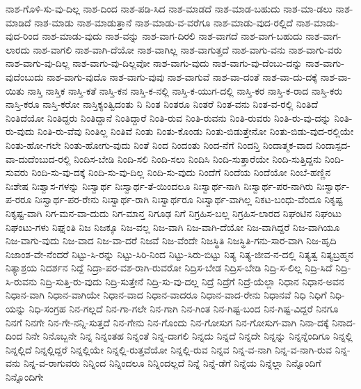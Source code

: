 {ನಾಶ-ಗೊಳಿ-ಸು-ವು-ದಿಲ್ಲ
ನಾಶ-ದಿಂದ
ನಾಶ-ಪಡಿ-ಸಿದ
ನಾಶ-ಮಾಡದೆ
ನಾಶ-ಮಾಡ-ಬಹುದು
ನಾಶ-ಮಾ-ಡಲು
ನಾಶ-ಮಾಡಿದೆ
ನಾಶ-ಮಾಡು
ನಾಶ-ಮಾಡುತ್ತಾನೆ
ನಾಶ-ಮಾಡು-ವ-ವರೆಗೂ
ನಾಶ-ಮಾಡು-ವುದ-ರಲ್ಲಿದೆ
ನಾಶ-ಮಾಡು-ವುದ-ರಿಂದ
ನಾಶ-ಮಾಡು-ವುದು
ನಾಶ-ವನ್ನು
ನಾಶ-ವಾಗ-ದಿರಲಿ
ನಾಶ-ವಾಗದೆ
ನಾಶ-ವಾಗ-ಬಹುದು
ನಾಶ-ವಾಗ-ಲಾರದು
ನಾಶ-ವಾಗಲಿ
ನಾಶ-ವಾಗಿ-ದೆಯೋ
ನಾಶ-ವಾಗಿಲ್ಲ
ನಾಶ-ವಾಗುತ್ತದೆ
ನಾಶ-ವಾಗು-ವನು
ನಾಶ-ವಾಗು-ವರು
ನಾಶ-ವಾಗು-ವು-ದಿಲ್ಲ
ನಾಶ-ವಾಗು-ವು-ದಿಲ್ಲವೋ
ನಾಶ-ವಾಗು-ವುದು
ನಾಶ-ವಾಗು-ವು-ದೆಂಬು-ದನ್ನು
ನಾಶ-ವಾಗು-ವುದೆಂಬುದು
ನಾಶ-ವಾಗು-ವುದೊ
ನಾಶ-ವಾಗು-ವುವು
ನಾಶ-ವಾಗುವೆ
ನಾಶ-ವಾ-ದಂತೆ
ನಾಶ-ವಾ-ದು-ದಕ್ಕೆ
ನಾಶ-ವಾ-ಯಿತು
ನಾಸ್ತಿ
ನಾಸ್ತಿಕ
ನಾಸ್ತಿ-ಕತೆ
ನಾಸ್ತಿ-ಕನ
ನಾಸ್ತಿ-ಕ-ನಲ್ಲಿ
ನಾಸ್ತಿ-ಕ-ಯುಗ-ದಲ್ಲಿ
ನಾಸ್ತಿ-ಕರ
ನಾಸ್ತಿ-ಕ-ರಾದ
ನಾಸ್ತಿ-ಕರು
ನಾಸ್ತಿ-ಕರೂ
ನಾಸ್ತಿ-ಕರೋ
ನಾಸ್ತಿಕ್ಯಂತ್ವಿದಂತು
ನಿ
ನಿಂತ
ನಿಂತರೂ
ನಿಂತರೆ
ನಿಂತ-ವನು
ನಿಂತ-ವ-ರಲ್ಲಿ
ನಿಂತಿದೆ
ನಿಂತಿದೆಯೋ
ನಿಂತಿದ್ದರು
ನಿಂತಿದ್ದಾನೆ
ನಿಂತಿದ್ದಾರೆ
ನಿಂತಿ-ರುವ
ನಿಂತಿ-ರುವನು
ನಿಂತಿ-ರುವರು
ನಿಂತಿ-ರು-ವು-ದನ್ನು
ನಿಂತಿ-ರು-ವುದು
ನಿಂತಿ-ರು-ವೆವು
ನಿಂತಿಲ್ಲ
ನಿಂತಿವೆ
ನಿಂತು
ನಿಂತು-ಕೊಂಡು
ನಿಂತು-ಬಿಡುತ್ತೇನೋ
ನಿಂತು-ಬಿಡು-ವುದ-ರಲ್ಲಿಯೇ
ನಿಂತು-ಹೋ-ಗಲೇ
ನಿಂತು-ಹೋಗು-ವುದು
ನಿಂತೆ
ನಿಂದ
ನಿಂದಂತು
ನಿಂದ-ನೆಗೆ
ನಿಂದನ್ತಿ
ನಿಂದಾತ್ಮಕ-ವಾದ
ನಿಂದಾಸ್ಪದ-ವಾ-ದುದೆಂಬುದ-ರಲ್ಲಿ
ನಿಂದಿಸ-ಬೇಡಿ
ನಿಂದಿ-ಸಲಿ
ನಿಂದಿ-ಸಲು
ನಿಂದಿಸಿ
ನಿಂದಿ-ಸುತ್ತಾರೆಯೇ
ನಿಂದಿ-ಸುತ್ತಿದ್ದನು
ನಿಂದಿ-ಸುವರು
ನಿಂದಿ-ಸು-ವು-ದಕ್ಕೆ
ನಿಂದಿ-ಸು-ವು-ದಿಲ್ಲ
ನಿಂದಿ-ಸು-ವುದು
ನಿಂದೆಗೆ
ನಿಂದೆಯ
ನಿಂದೆಯೋ
ನಿಂಬೆ-ಹಣ್ಣಿನ
ನಿಃಶೇಷ
ನಿಃಶ್ವಾಸ-ಗಳನ್ನು
ನಿಃಸ್ವಾರ್ಥ
ನಿಃಸ್ವಾರ್ಥ-ತೆ-ಯಿಂದಲೂ
ನಿಃಸ್ವಾರ್ಥ-ನಾಗಿ
ನಿಃಸ್ವಾರ್ಥ-ಪರ-ನಾಗಿರು
ನಿಃಸ್ವಾರ್ಥ-ಪ-ರರೂ
ನಿಃಸ್ವಾರ್ಥ-ಪರ-ರೇನು
ನಿಃಸ್ವಾರ್ಥ-ರಾಗಿ
ನಿಃಸ್ವಾರ್ಥರೂ
ನಿಃಸ್ವಾರ್ಥ-ವಾಗಿಲ್ಲ
ನಿಕಟ-ಬಂಧು-ವೆಂದೂ
ನಿಕೃಷ್ಟ
ನಿಕೃಷ್ಟ-ವಾಗಿ
ನಿಗ-ಮನ-ವಾ-ದುದು
ನಿಗ-ಮಾನ್ತ
ನಿಗೂಢ
ನಿಗೆ
ನಿಗ್ರಹಿಸ-ಬಲ್ಲ
ನಿಗ್ರಹಿಸ-ಲಾರದ
ನಿಘಂಟಿನ
ನಿಘಂಟು
ನಿಘಂಟು-ಗಳು
ನಿಘ್ನಂತಿ
ನಿಜ
ನಿಜಕ್ಕೂ
ನಿಜ-ವಲ್ಲ
ನಿಜ-ವಾಗಿ
ನಿಜ-ವಾಗಿ-ದೆಯೋ
ನಿಜ-ವಾಗಿದ್ದರೆ
ನಿಜ-ವಾಗಿಯೂ
ನಿಜ-ವಾಗು-ವುದು
ನಿಜ-ವಾದ
ನಿಜ-ವಾ-ದರೆ
ನಿಜವೆ
ನಿಜ-ವೆಂದೇ
ನಿಜಸ್ಥಿತಿ
ನಿಜಸ್ಥಿತಿ-ಗನು-ಸಾರ-ವಾಗಿ
ನಿಜ-ಹೃದಿ
ನಿಜಾಂಶ-ವೇ-ನೆಂದರೆ
ನಿಟ್ಟು-ಸಿ-ರನ್ನು
ನಿಟ್ಟು-ಸಿರಿ-ನಿಂದ
ನಿಟ್ಟು-ಸಿರು-ಬಿಟ್ಟು
ನಿತ್ಯ
ನಿತ್ಯ-ಜೀವ-ನ-ದಲ್ಲಿ
ನಿತ್ಯತ್ವ
ನಿತ್ಯಬ್ರಹ್ಮನ
ನಿತ್ಯಾಶ್ರಯ
ನಿದರ್ಶನ
ನಿದ್ದೆ
ನಿದ್ರಾ-ಪರ-ವಶ-ರಾಗಿ-ರುವರೋ
ನಿದ್ರಿಸ-ಬೇಡ
ನಿದ್ರಿಸ-ಬೇಡಿ
ನಿದ್ರಿ-ಸ-ಲಿಲ್ಲ
ನಿದ್ರಿ-ಸಿದೆ
ನಿದ್ರಿ-ಸಿ-ರುವನು
ನಿದ್ರಿ-ಸುತ್ತಿ-ರು-ವುದು
ನಿದ್ರಿ-ಸುತ್ತೇನೆ
ನಿದ್ರಿ-ಸು-ವು-ದಲ್ಲ
ನಿದ್ರೆ
ನಿದ್ರೆಗೆ
ನಿದ್ರೆ-ಯೆಲ್ಲಾ
ನಿಧಾನ
ನಿಧಾನ-ಅವನ
ನಿಧಾನ-ವಾಗಿ
ನಿಧಾನ-ವಾಗಿಯೇ
ನಿಧಾನ-ವಾದ
ನಿಧಾನ-ವಾದರೂ
ನಿಧಾನ-ವಾದ-ರೇನು
ನಿಧಾನವೆ
ನಿಧಿ
ನಿಧಿಗೆ
ನಿಧಿ-ಯನ್ನು
ನಿಧಿ-ಸಂಗ್ರಹ
ನಿನ-ಗಲ್ಲದೆ
ನಿನ-ಗಾ-ಗಲೇ
ನಿನ-ಗಾಗಿ
ನಿನ-ಗಿಂತ
ನಿನ-ಗಿಷ್ಟ-ಬಂದ
ನಿನ-ಗಿಷ್ಟ-ವಿದ್ದರೆ
ನಿನಗೂ
ನಿನಗೆ
ನಿನಗೇ
ನಿನ-ಗೇ-ನನ್ನಿ-ಸುತ್ತದೆ
ನಿನ-ಗೇನು
ನಿನ-ಗೊಂದು
ನಿನ-ಗೋಸುಗ
ನಿನ-ಗೋಸುಗ-ವಾಗಿ
ನಿನಾ-ದಕ್ಕೆ
ನಿನಾದ-ದಿಂದ
ನಿನೇ
ನಿನೊಬ್ಬನೇ
ನಿನ್ನ
ನಿನ್ನಂತಹ
ನಿನ್ನಂತೆ
ನಿನ್ನ-ದಾಗಲಿ
ನಿನ್ನದು
ನಿನ್ನದೆ
ನಿನ್ನದೇ
ನಿನ್ನನ್ನು
ನಿನ್ನನ್ನೆಂದಿಗೂ
ನಿನ್ನಲ್ಲಿ
ನಿನ್ನಲ್ಲಿದೆ
ನಿನ್ನಲ್ಲಿದ್ದರೆ
ನಿನ್ನಲ್ಲಿಯೇ
ನಿನ್ನಲ್ಲಿ-ರುತ್ತವೆಯೋ
ನಿನ್ನಲ್ಲಿ-ರುವ
ನಿನ್ನವ
ನಿನ್ನ-ವ-ನಾಗಿ
ನಿನ್ನ-ವ-ನಾಗಿ-ರುವ
ನಿನ್ನ-ವನು
ನಿನ್ನ-ವ-ರಾಗುವರು
ನಿನ್ನಿಂದ
ನಿನ್ನಿಂದಲೂ
ನಿನ್ನಿಂದಲ್ಲದೆ
ನಿನ್ನೆ
ನಿನ್ನೆ-ಡೆಗೆ
ನಿನ್ನೆಯ
ನಿನ್ನೆಲ್ಲಾ
ನಿನ್ನೊಂದಿಗೆ
ನಿನ್ನೊಂದಿಗೇ
}
